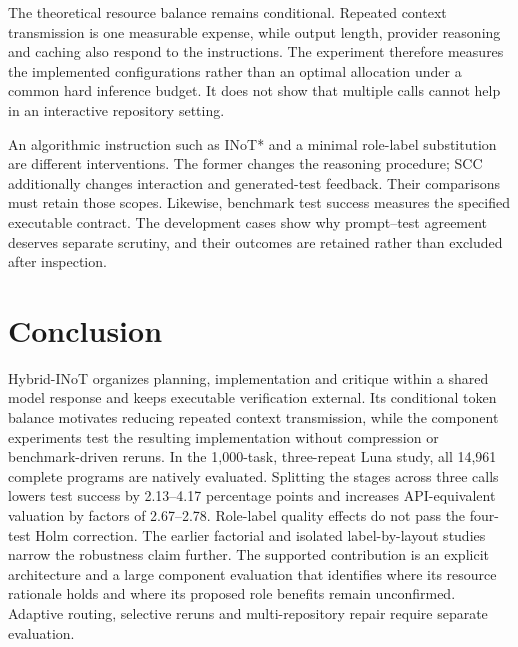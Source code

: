 The theoretical resource balance remains conditional. Repeated context transmission is one measurable expense, while output length, provider reasoning and caching also respond to the instructions. The experiment therefore measures the implemented configurations rather than an optimal allocation under a common hard inference budget. It does not show that multiple calls cannot help in an interactive repository setting.

An algorithmic instruction such as INoT* and a minimal role-label substitution are different interventions. The former changes the reasoning procedure; SCC additionally changes interaction and generated-test feedback. Their comparisons must retain those scopes. Likewise, benchmark test success measures the specified executable contract. The development cases show why prompt--test agreement deserves separate scrutiny, and their outcomes are retained rather than excluded after inspection.








\section{Conclusion}
Hybrid-INoT organizes planning, implementation and critique within a shared model response and keeps executable verification external. Its conditional token balance motivates reducing repeated context transmission, while the component experiments test the resulting implementation without compression or benchmark-driven reruns. In the 1,000-task, three-repeat Luna study, all 14,961 complete programs are natively evaluated. Splitting the stages across three calls lowers test success by 2.13--4.17 percentage points and increases API-equivalent valuation by factors of 2.67--2.78. Role-label quality effects do not pass the four-test Holm correction. The earlier factorial and isolated label-by-layout studies narrow the robustness claim further. The supported contribution is an explicit architecture and a large component evaluation that identifies where its resource rationale holds and where its proposed role benefits remain unconfirmed. Adaptive routing, selective reruns and multi-repository repair require separate evaluation.

